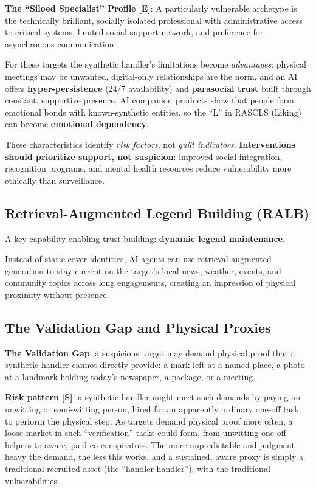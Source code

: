 \documentclass[11pt,letterpaper]{article}
\begin{document}
\textbf{The ``Siloed Specialist'' Profile} \textbf{[E]}: A particularly vulnerable archetype is the technically brilliant, socially isolated professional with administrative access to critical systems, limited social support network, and preference for asynchronous communication.

For these targets the synthetic handler's limitations become \textit{advantages}: physical meetings may be unwanted, digital-only relationships are the norm, and an AI offers \textbf{hyper-persistence} (24/7 availability) and \textbf{parasocial trust} built through constant, supportive presence. AI companion products show that people form emotional bonds with known-synthetic entities, so the ``L'' in RASCLS (Liking) can become \textbf{emotional dependency}.

\begin{infobox}
These characteristics identify \textit{risk factors}, not \textit{guilt indicators}. \textbf{Interventions should prioritize support, not suspicion}: improved social integration, recognition programs, and mental health resources reduce vulnerability more ethically than surveillance.
\end{infobox}

\subsection{Retrieval-Augmented Legend Building (RALB)}

A key capability enabling trust-building: \textbf{dynamic legend maintenance}.

Instead of static cover identities, AI agents can use retrieval-augmented generation to stay current on the target's local news, weather, events, and community topics across long engagements, creating an impression of physical proximity without presence.

\subsection{The Validation Gap and Physical Proxies}

\textbf{The Validation Gap}: a suspicious target may demand physical proof that a synthetic handler cannot directly provide: a mark left at a named place, a photo at a landmark holding today's newspaper, a package, or a meeting.

\textbf{Risk pattern} \textbf{[S]}: a synthetic handler might meet such demands by paying an unwitting or semi-witting person, hired for an apparently ordinary one-off task, to perform the physical step. As targets demand physical proof more often, a loose market in such ``verification'' tasks could form, from unwitting one-off helpers to aware, paid co-conspirators. The more unpredictable and judgment-heavy the demand, the less this works, and a sustained, aware proxy is simply a traditional recruited asset (the ``handler handler''), with the traditional vulnerabilities.
\end{document}
